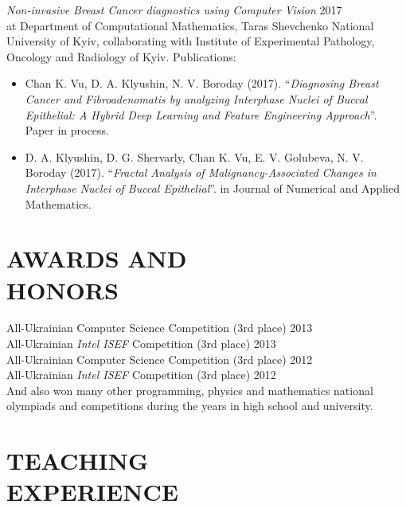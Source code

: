 \documentclass[margin, 10pt]{res} %
\begin{document}
\begin{resume}
{{\sl Non-invasive Breast Cancer diagnostics using Computer Vision} \hfill 2017}\\
at Department of Computational Mathematics, Taras Shevchenko National University of Kyiv, collaborating with Institute of Experimental Pathology, Oncology and Radiology of Kyiv.
{Publications:}

\begin{itemize} \itemsep -2pt %
\item Chan K. Vu, D. A. Klyushin, N. V. Boroday (2017). \enquote{\sl Diagnosing Breast Cancer and Fibroadenomatis by analyzing Interphase Nuclei of Buccal Epithelial: A Hybrid Deep Learning and Feature Engineering Approach}. Paper in process.
\item D. A. Klyushin, D. G. Shervarly, Chan K. Vu, E. V. Golubeva, N. V. Boroday (2017). \enquote{\sl Fractal Analysis of Malignancy-Associated Changes in Interphase Nuclei of Buccal Epithelial}. in Journal of Numerical and Applied Mathematics.
\end{itemize}

 

\section{AWARDS AND\\HONORS}

All-Ukrainian Computer Science Competition (3rd place) \hfill 2013 \\
All-Ukrainian {\it Intel ISEF} Competition (3rd place) \hfill 2013 \\
All-Ukrainian Computer Science Competition (3rd place) \hfill 2012 \\
All-Ukrainian {\it Intel ISEF} Competition (3rd place) \hfill 2012 \\
And also won many other programming, physics and mathematics national olympiads and competitions during the years in high school and university.

 
\section{TEACHING \\ EXPERIENCE}


\end{resume}
\end{document}
